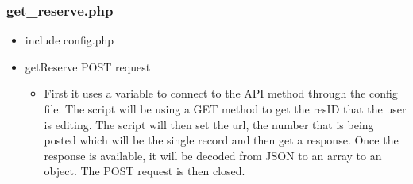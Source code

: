     \subsubsection{get\_reserve.php}
        \begin{itemize}
            \item include config.php
            \item getReserve POST request
            \begin{itemize}
                \item First it uses a variable to connect to the API method through the config file. The script will be using a GET method to get the resID that the user is editing. The script will then set the url, the number that is being posted which will be the single record and then get a response. Once the response is available, it will be decoded from JSON to an array to an object. The POST request is then closed.
            \end{itemize}
        \end{itemize}

